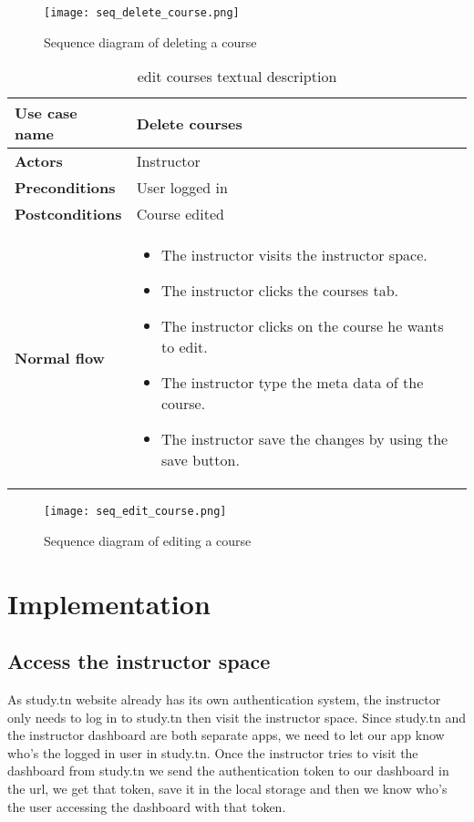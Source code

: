 \begin{figure}[!ht]
    \centering
    \texttt{[image: seq\_delete\_course.png]}
    \caption{Sequence diagram of deleting a course}
    \label{fig:seq_delete_course}
\end{figure}

\newpage
\vfill

\begin{table}[H]
\centering
\caption{edit courses textual description}
\begin{tabular}{|p{4cm}|p{10cm}|}
\hline
\textbf{\large{Use case name}} & Delete courses \\\hline
\textbf{\large{Actors}} & Instructor \\\hline
\textbf{\large{Preconditions}} & User logged in \\\hline
\textbf{\large{Postconditions}} & Course edited  \\\hline
\textbf{\large{Normal flow}} & 
\begin{itemize}
  \item The instructor visits the instructor space.
  \item The instructor clicks the courses tab.
  \item The instructor clicks on the course he wants to edit.
  \item The instructor type the meta data of the course.
  \item The instructor save the changes by using the save button.
\end{itemize}
\\\hline

\end{tabular}
\end{table}

\begin{figure}[!ht]
    \centering
    \texttt{[image: seq\_edit\_course.png]}
    \caption{Sequence diagram of editing a course}
    \label{fig:seq_edit_course}
\end{figure}

\vfill
\clearpage

\section{Implementation}

\subsection{Access the instructor space}
As study.tn website already has its own authentication system, the instructor only needs to log in to study.tn then visit the instructor space. Since study.tn and the instructor dashboard are both separate apps, we need to let our app know who's the logged in user in study.tn. Once the instructor tries to visit the dashboard from study.tn we send the authentication token to our dashboard in the url, we get that token, save it in the local storage and then we know who's the user accessing the dashboard with that token.

